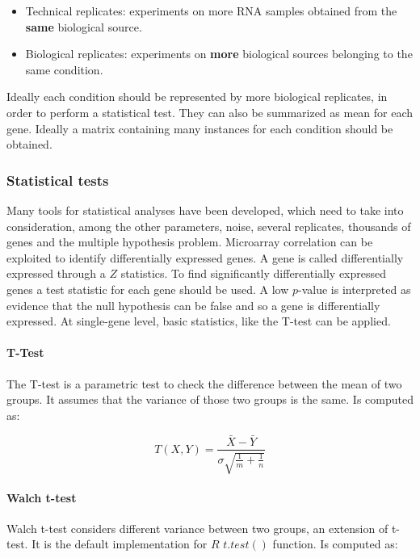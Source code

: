 		\begin{multicols}{2}
			\begin{itemize}
				\item Technical replicates: experiments on more RNA samples obtained from the \textbf{same} biological source.
				\item Biological replicates: experiments on \textbf{more} biological sources belonging to the same condition.
			\end{itemize}
		\end{multicols}

		Ideally each condition should be represented by more biological replicates, in order to perform a statistical test.
		They can also be summarized as mean for each gene.
		Ideally a matrix containing many instances for each condition should be obtained.

		\subsubsection{Statistical tests}
		Many tools for statistical analyses have been developed, which need to take into consideration, among the other parameters, noise, several replicates, thousands of genes and the multiple hypothesis problem.
		Microarray correlation can be exploited to identify differentially expressed genes.
		A gene is called differentially expressed through a $Z$ statistics.
		To find significantly differentially expressed genes a test statistic for each gene should be used.
		A low $p$-value is interpreted as evidence that the null hypothesis can be false and so a gene is differentially expressed.
		At single-gene level, basic statistics, like the T-test can be applied.

			\paragraph{T-Test}

			The T-test is a parametric test to check the difference between the mean of two groups.
			It assumes that the variance of those two groups is the same.
			Is computed as:

			$$T(X, Y) = \frac{\bar{X}-\bar{Y}}{\sigma\sqrt{\frac{1}{m}+\frac{1}{n}}}$$

			\paragraph{Walch t-test}
			Walch t-test considers different variance between two groups, an extension of t-test.
			It is the default implementation for $R$ $t.test()$ function.
			Is computed as:

